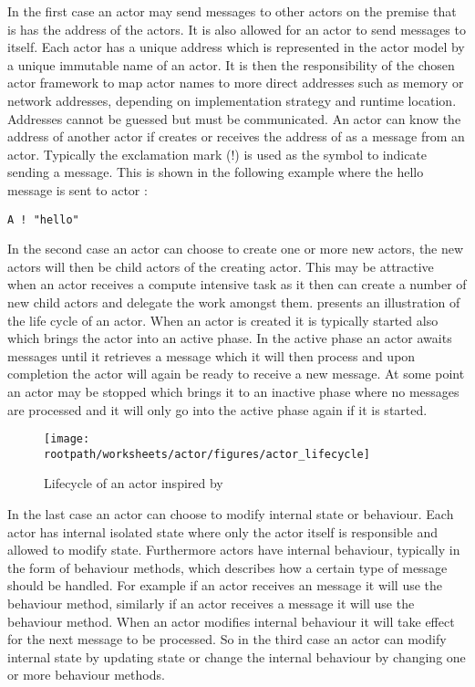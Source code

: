 In the first case an actor may send messages to other actors on the premise that is has the address of the actors. It is also allowed for an actor to send messages to itself. Each actor has a unique address which is represented in the actor model by a unique immutable name of an actor\cite[p. 2]{karmani2009actor}. It is then the responsibility of the chosen actor framework to map actor names to more direct addresses such as memory or network addresses, depending on implementation strategy and runtime location\cite[p. 3]{hewitt2014actor}. Addresses cannot be guessed but must be communicated. An actor  can know the address of another actor  if  creates  or receives the address of  as a message from an actor. Typically the exclamation mark (!) is used as the symbol to indicate sending a message. This is shown in the following example where the hello message is sent to actor :
\begin{verbatim}
A ! "hello"
\end{verbatim}

In the second case an actor can choose to create one or more new actors, the new actors will then be child actors of the creating actor. This may be attractive when an actor receives a compute intensive task as it then can create a number of new child actors and delegate the work amongst them.  presents an illustration of the life cycle of an actor. When an actor is created it is typically started also which brings the actor into an active phase. In the active phase an actor awaits messages until it retrieves a message which it will then process and upon completion the actor will again be ready to receive a new message. At some point an actor may be stopped which brings it to an inactive phase where no messages are processed and it will only go into the active phase again if it is started.

\begin{figure}[ht!]
\centering
\texttt{[image: \\rootpath/worksheets/actor/figures/actor\_lifecycle]}
\caption{Lifecycle of an actor inspired by \cite[Figure 12]{subramaniam2011programming}}\label{fig:actor_lifecycle}
\end{figure}
In the last case an actor can choose to modify internal state or behaviour. Each actor has internal isolated state where only the actor itself is responsible and allowed to modify state. Furthermore actors have internal behaviour, typically in the form of behaviour methods, which describes how a certain type of message should be handled. For example if an actor receives an  message it will use the  behaviour method, similarly  if an actor receives a  message it will use the  behaviour method. When an actor modifies internal behaviour it will take effect for the next message to be processed. So in the third case an actor can modify internal state by updating state or change the internal behaviour by changing one or more behaviour methods.

